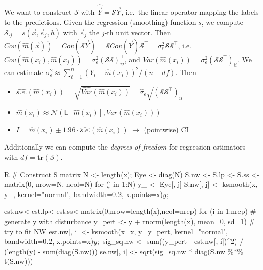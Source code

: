 \begin{sectionbox}\nospacing{}
  We want to construct $\mathcal{S}$ with $\hat{\vec{Y}} = \mathcal{S}\vec{Y}$, i.e.\ the linear operator mapping the labels to the predictions.
  Given the regression (smoothing) function $s$, we compute $\mathcal{S}_{\cdot j} = s(\vec{x}, \vec{e}_{j}, h)$ with $\vec{e}_{j}$ the $j$-th unit vector.
  Then $Cov(\hat m(\vec{x})) = Cov(\mathcal{S} \vec{Y}) = \mathcal{S} Cov(\vec{Y}) \mathcal{S}^{\top} = \sigma_{\epsilon}^{2}\mathcal{S}\mathcal{S}^{\top}$, i.e. $Cov(\hat m(x_{i}), \hat m(x_{j})) = \sigma_{\epsilon}^{2}{(\mathcal{S}\mathcal{S})}^{\top}_{ij}$, and $Var(\hat m(x_{i})) = \sigma_{\epsilon}^{2}{(\mathcal{S}\mathcal{S}^{\top})}_{ii}$.
  We can estimate $\sigma_{\epsilon}^{2} \approx \sum_{i=1}^{n}{(Y_{i} - \hat m(x_{i}))}^{2}/(n-df)$.
  Then
  \begin{itemize}
    \item $\widehat{s.e.}(\hat m(x_{i})) = \sqrt{\widehat{Var}(\hat m(x_{i}))} = \hat \sigma_{\epsilon} \sqrt{{(\mathcal{S}\mathcal{S}^{\top})}_{ii}}$
    \item $\hat m(x_{i}) \approx \mathcal{N}\left(\mathbb{E}[\hat m(x_{i})], Var(\hat m(x_{i}))\right)$
    \item $I = \hat m(x_{i}) \pm 1.96 \cdot \widehat{s.e.}(\hat m(x_{i}))$ $\rightarrow$ (pointwise) CI
  \end{itemize}

  Additionally we can compute the \emph{degrees of freedom} for regression estimators with $df = \mathbf{tr}(\mathcal{S})$.

  \begin{mintlinebox}{R}
# Construct S matrix
N <- length(x); Eye <- diag(N)
S.nw <- S.lp <- S.ss <- matrix(0, nrow=N, ncol=N)
for (j in 1:N) {
  y_ <- Eye[, j]
  S.nw[, j] <- ksmooth(x, y_, kernel="normal", bandwidth=0.2, x.points=x)$y ;$}

est.nw<-est.lp<-est.ss<-matrix(0,nrow=length(x),ncol=nrep)
for (i in 1:nrep) {
  # generate y with disturbance
  y_pert <- y + rnorm(length(x), mean=0, sd=1)
  # try to fit NW
  est.nw[, i] <- ksmooth(x=x, y=y_pert, kernel="normal", bandwidth=0.2, x.points=x)$y ;$
  sig_sq.nw <- sum((y_pert - est.nw[, i])^2) / (length(y) - sum(diag(S.nw)))
  se.nw[, i] <- sqrt(sig_sq.nw * diag(S.nw \%*\% t(S.nw)))}

  \end{mintlinebox}


\end{sectionbox}
